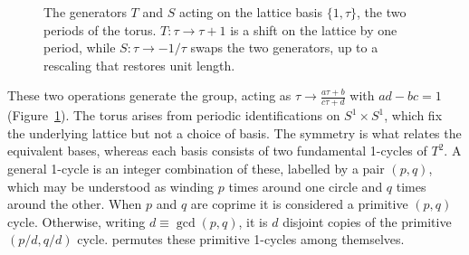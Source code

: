 \begin{figure}[ht]
\centering
{}
\caption{The generators $T$ and $S$ acting on the lattice basis $\{1,\tau\}$, the two periods of the torus. $T:\tau\to\tau+1$ is a shift on the lattice by one period, while $S:\tau\to-1/\tau$ swaps the two generators, up to a rescaling that restores unit length.}
\label{fig:st-cycles}
\end{figure}

These two operations generate the \SLZ{} group, acting as $\tau \to \frac{a\tau+b}{c\tau+d}$ with $ad-bc=1$ (Figure~\ref{fig:st-cycles}).
The torus arises from periodic identifications on $S^1 \times S^1$, which fix the underlying lattice but not a choice of basis. 
The \SLZ{} symmetry is what relates the equivalent bases, whereas each basis consists of two fundamental 1-cycles of $T^2$.
A general 1-cycle is an integer combination of these, labelled by a pair $(p,q)$, which may be understood as winding $p$ times around one circle and $q$ times around the other.
When $p$ and $q$ are coprime it is considered a primitive $(p,q)$ cycle. 
Otherwise, writing $d \equiv \gcd(p,q)$, it is $d$ disjoint copies of the primitive $(p/d, q/d)$ cycle.
\SLZ{} permutes these primitive 1-cycles among themselves.

